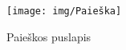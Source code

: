 \documentclass{VUMIFPSkursinis}
\begin{document}
\begin{figure}[H]
    \centering
    \texttt{[image: img/Paieška]}
    \caption{Paieškos puslapis}
    \label{img:PaieškaPuslapis}
\end{figure}




\end{document}
